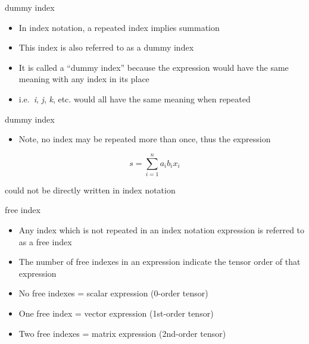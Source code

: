 \documentclass[
  letterpaper,
  ignorenonframetext,
  aspectratio=43,
  handout,
  12pt]{beamer}
\providecommand{\tightlist}{%
  \setlength{\itemsep}{0pt}\setlength{\parskip}{0pt}}
\providecommand{\tightlist}{%
\setlength{\itemsep}{0pt}\setlength{\parskip}{0pt}}
\begin{document}
\begin{frame}{dummy index}
\protect\hypertarget{dummy-index}{}
\begin{itemize}
\tightlist
\item
  In index notation, a repeated index implies summation
\item
  This index is also referred to as a dummy index
\item
  It is called a ``dummy index'' because the expression would have the
  same meaning with any index in its place
\item
  i.e.~\emph{i}, \emph{j}, \emph{k}, etc. would all have the same
  meaning when repeated
\end{itemize}
\end{frame}

\begin{frame}{dummy index}
\protect\hypertarget{dummy-index-1}{}
\begin{itemize}
\tightlist
\item
  Note, no index may be repeated more than once, thus the expression
\end{itemize}

\[s = \sum_{i=1}^{n}a_ib_ix_i\]

could not be directly written in index notation
\end{frame}

\begin{frame}{free index}
\protect\hypertarget{free-index}{}
\begin{itemize}
\tightlist
\item
  Any index which is not repeated in an index notation expression is
  referred to as a free index
\item
  The number of free indexes in an expression indicate the tensor order
  of that expression
\item
  No free indexes = scalar expression (0-order tensor)
\item
  One free index = vector expression (1st-order tensor)
\item
  Two free indexes = matrix expression (2nd-order tensor)
\end{itemize}
\end{frame}
\end{document}
